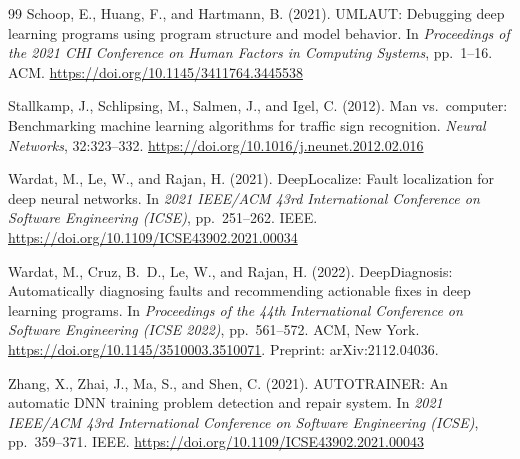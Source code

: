 \begin{thebibliography}{99}
Schoop, E., Huang, F., and Hartmann, B. (2021).
\newblock UMLAUT: Debugging deep learning programs using program structure and model behavior.
\newblock In \emph{Proceedings of the 2021 CHI Conference on Human Factors in Computing Systems}, pp.~1--16. ACM.
\newblock \url{https://doi.org/10.1145/3411764.3445538}

Stallkamp, J., Schlipsing, M., Salmen, J., and Igel, C. (2012).
\newblock Man vs.\ computer: Benchmarking machine learning algorithms for traffic sign recognition.
\newblock \emph{Neural Networks}, 32:323--332.
\newblock \url{https://doi.org/10.1016/j.neunet.2012.02.016}

Wardat, M., Le, W., and Rajan, H. (2021).
\newblock DeepLocalize: Fault localization for deep neural networks.
\newblock In \emph{2021 IEEE/ACM 43rd International Conference on Software Engineering (ICSE)}, pp.~251--262. IEEE.
\newblock \url{https://doi.org/10.1109/ICSE43902.2021.00034}

Wardat, M., Cruz, B.~D., Le, W., and Rajan, H. (2022).
\newblock DeepDiagnosis: Automatically diagnosing faults and recommending actionable fixes in deep learning programs.
\newblock In \emph{Proceedings of the 44th International Conference on Software Engineering (ICSE 2022)}, pp.~561--572. ACM, New York.
\newblock \url{https://doi.org/10.1145/3510003.3510071}. Preprint: arXiv:2112.04036.

Zhang, X., Zhai, J., Ma, S., and Shen, C. (2021).
\newblock AUTOTRAINER: An automatic DNN training problem detection and repair system.
\newblock In \emph{2021 IEEE/ACM 43rd International Conference on Software Engineering (ICSE)}, pp.~359--371. IEEE.
\newblock \url{https://doi.org/10.1109/ICSE43902.2021.00043}

\end{thebibliography}
